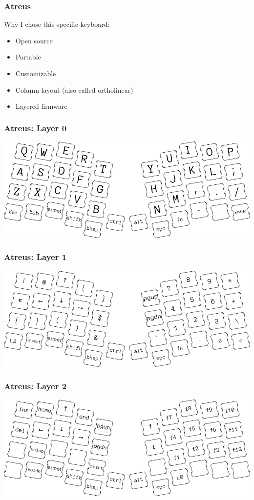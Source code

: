 \documentclass{beamer}
\begin{document}
\begin{frame}
  \frametitle{Atreus}
  Why I chose this specific keyboard:
  \begin{itemize}
    \item Open source
    \item Portable
    \item Customizable
    \item Column layout (also called ortholinear)
    \item Layered firmware
  \end{itemize}
\end{frame}




\begin{frame}
  \frametitle{Atreus: Layer 0}
  \includegraphics[scale=0.45]{images/atreus-layer-1}
\end{frame}

\begin{frame}
  \frametitle{Atreus: Layer 1}
  \includegraphics[scale=0.45]{images/atreus-layer-2}
\end{frame}

\begin{frame}
  \frametitle{Atreus: Layer 2}
  \includegraphics[scale=0.45]{images/atreus-layer-3}
\end{frame}
\end{document}
